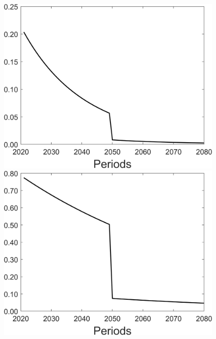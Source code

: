 \begin{figure}[h!!]
\begin{minipage}[]{0.32\textwidth}
	\end{minipage}
	\begin{minipage}[]{0.32\textwidth}
		\includegraphics[width=1\textwidth]{../../codding_model/Own/figures/Rep_agent/staticonlyRam_separate_hl_periods59_eppsilon0.40_zeta1.40_Ad08_Ac04_thetac0.70_thetad0.56_HetGrowth1_tauul0.181_util0_withtarget1_lgd0.png}
	\end{minipage}
	\begin{minipage}[]{0.32\textwidth}
		\includegraphics[width=1\textwidth]{../../codding_model/Own/figures/Rep_agent/staticonlyRam_separate_yc_periods59_eppsilon0.40_zeta1.40_Ad08_Ac04_thetac0.70_thetad0.56_HetGrowth1_tauul0.181_util0_withtarget1_lgd0.png}

\end{minipage}
\end{figure}
